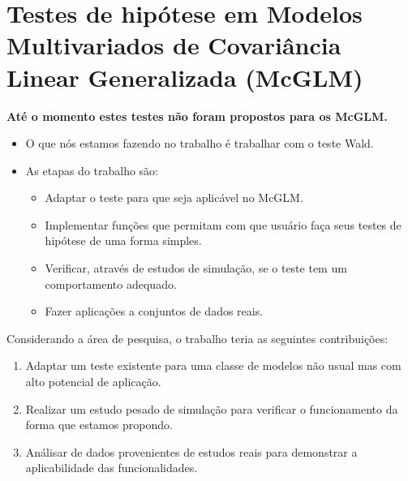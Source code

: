 \documentclass[10pt,
  aspectratio=169,
  serif,
  mathserif,
  professionalfont,
  compress,
  handout,
  ]{beamer}\usepackage[]{graphicx}\usepackage[]{color}
\begin{document}
\section{Testes de hipótese em Modelos Multivariados de Covariância Linear Generalizada (McGLM)}

\begin{frame}[c, allowframebreaks]

\textbf{Até o momento estes testes não foram propostos para os McGLM.}

\begin{itemize}
  \item O que nós estamos fazendo no trabalho é trabalhar com o teste Wald.
  
  \item As etapas do trabalho são:
  
  \begin{itemize}
    \item Adaptar o teste para que seja aplicável no McGLM.
    
    \item Implementar funções que permitam com que usuário faça seus testes de hipótese de uma forma simples.
    
    \item Verificar, através de estudos de simulação, se o teste tem um comportamento adequado.
    
    \item Fazer aplicações a conjuntos de dados reais.
    
  \end{itemize}

\end{itemize}


\end{frame}


\begin{frame}[c, allowframebreaks]

Considerando a área de pesquisa, o trabalho teria as seguintes contribuições:

\begin{enumerate}
  \item Adaptar um teste existente para uma classe de modelos não usual mas com alto potencial de aplicação.
  \item Realizar um estudo pesado de simulação para verificar o funcionamento da forma que estamos propondo.
  \item Análisar de dados provenientes de estudos reais para demonstrar a aplicabilidade das funcionalidades.
\end{enumerate}

\end{frame}
\end{document}
